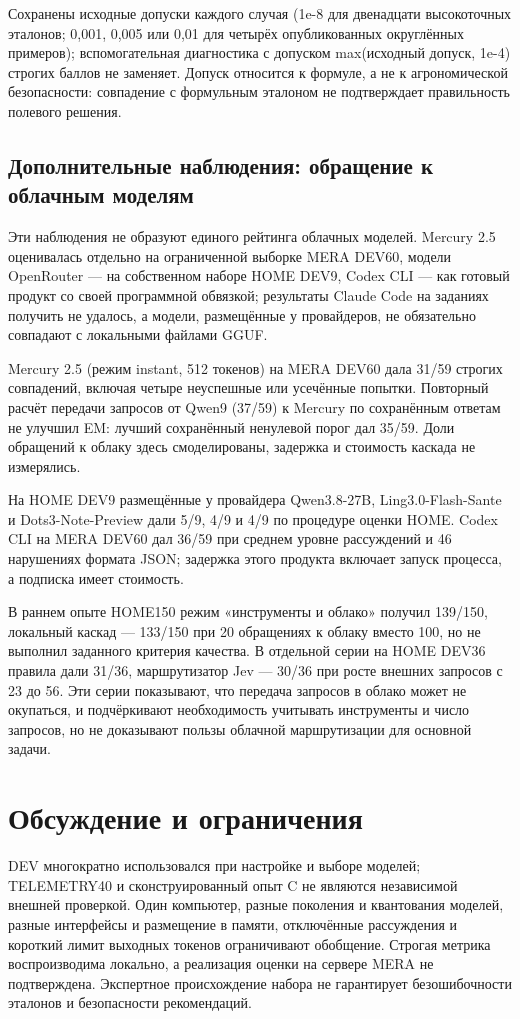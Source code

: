 \documentclass[14pt,a4paper]{extarticle}
\begin{document}
Сохранены исходные допуски каждого случая (1e-8 для двенадцати высокоточных эталонов; 0,001, 0,005 или 0,01 для четырёх опубликованных округлённых примеров); вспомогательная диагностика с допуском max(исходный допуск, 1e-4) строгих баллов не заменяет. Допуск относится к формуле, а не к агрономической безопасности: совпадение с формульным эталоном не подтверждает правильность полевого решения.

\subsection*{Дополнительные наблюдения: обращение к облачным моделям}
Эти наблюдения не образуют единого рейтинга облачных моделей. Mercury 2.5 оценивалась отдельно на ограниченной выборке MERA DEV60, модели OpenRouter — на собственном наборе HOME DEV9, Codex CLI — как готовый продукт со своей программной обвязкой; результаты Claude Code на заданиях получить не удалось, а модели, размещённые у провайдеров, не обязательно совпадают с локальными файлами GGUF.

Mercury 2.5 (режим instant, 512 токенов) на MERA DEV60 дала 31/59 строгих совпадений, включая четыре неуспешные или усечённые попытки. Повторный расчёт передачи запросов от Qwen9 (37/59) к Mercury по сохранённым ответам не улучшил EM: лучший сохранённый ненулевой порог дал 35/59. Доли обращений к облаку здесь смоделированы, задержка и стоимость каскада не измерялись.

На HOME DEV9 размещённые у провайдера Qwen3.8-27B, Ling3.0-Flash-Sante и Dots3-Note-Preview дали 5/9, 4/9 и 4/9 по процедуре оценки HOME. Codex CLI на MERA DEV60 дал 36/59 при среднем уровне рассуждений и 46 нарушениях формата JSON; задержка этого продукта включает запуск процесса, а подписка имеет стоимость.

В раннем опыте HOME150 режим «инструменты и облако» получил 139/150, локальный каскад — 133/150 при 20 обращениях к облаку вместо 100, но не выполнил заданного критерия качества. В отдельной серии на HOME DEV36 правила дали 31/36, маршрутизатор Jev — 30/36 при росте внешних запросов с 23 до 56. Эти серии показывают, что передача запросов в облако может не окупаться, и подчёркивают необходимость учитывать инструменты и число запросов, но не доказывают пользы облачной маршрутизации для основной задачи.

\section*{Обсуждение и ограничения}
DEV многократно использовался при настройке и выборе моделей; TELEMETRY40 и сконструированный опыт C не являются независимой внешней проверкой. Один компьютер, разные поколения и квантования моделей, разные интерфейсы и размещение в памяти, отключённые рассуждения и короткий лимит выходных токенов ограничивают обобщение. Строгая метрика воспроизводима локально, а реализация оценки на сервере MERA не подтверждена. Экспертное происхождение набора не гарантирует безошибочности эталонов и безопасности рекомендаций.
\end{document}
